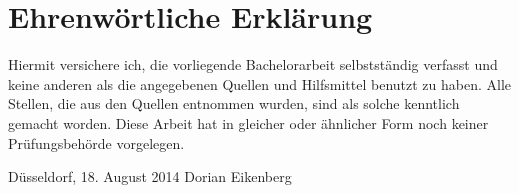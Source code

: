 \chapter*{Ehrenwörtliche Erklärung}

Hiermit versichere ich, die vorliegende Bachelorarbeit selbstständig 
verfasst und keine anderen als die angegebenen Quellen und Hilfsmittel
benutzt zu haben.
Alle Stellen, die aus den Quellen entnommen
wurden, sind als solche kenntlich gemacht worden. Diese Arbeit hat in
gleicher oder ähnlicher Form noch keiner Prüfungsbehörde vorgelegen.

\vspace{3cm}

\noindent Düsseldorf, 18. August 2014 \hfill Dorian Eikenberg
